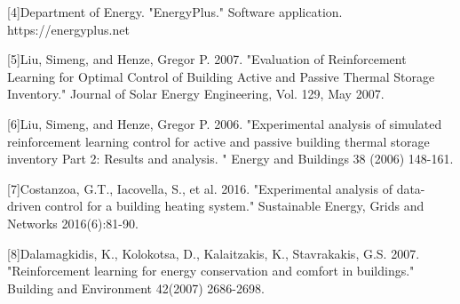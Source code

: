 \documentclass{article}
\begin{document}
[4]Department of Energy. "EnergyPlus." Software application. https://energyplus.net

[5]Liu, Simeng, and Henze, Gregor P. 2007. "Evaluation of Reinforcement
Learning for Optimal Control of
Building Active and Passive
Thermal Storage Inventory." Journal of Solar Energy Engineering, Vol. 129, May 2007.

[6]Liu, Simeng, and Henze, Gregor P. 2006. "Experimental analysis of simulated reinforcement learning control for active and passive building thermal storage inventory Part 2: Results and analysis. " Energy and Buildings 38 (2006) 148-161.


[7]Costanzoa, G.T., Iacovella, S., et al. 2016. "Experimental analysis of data-driven control for a building heating system." Sustainable Energy, Grids and Networks 2016(6):81-90.

[8]Dalamagkidis, K., Kolokotsa, D., Kalaitzakis, K., Stavrakakis, G.S. 2007. "Reinforcement learning for energy conservation and comfort in buildings." Building and Environment 42(2007) 2686-2698.
\end{document}

